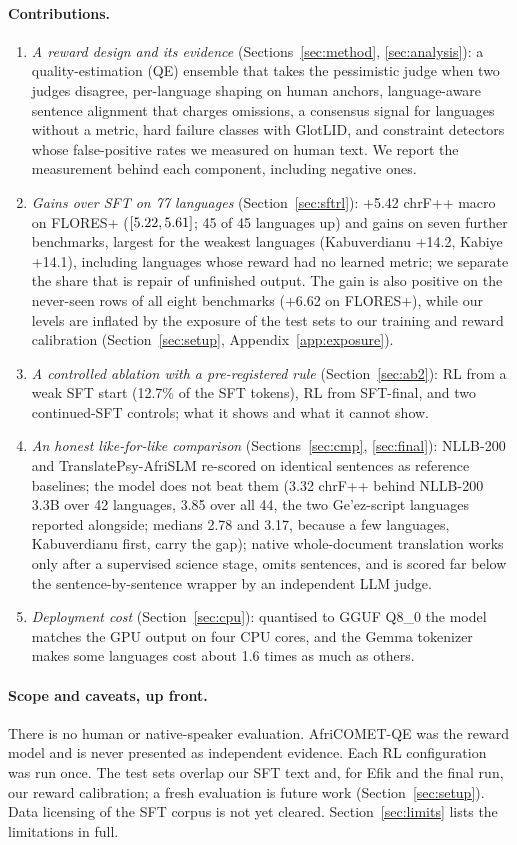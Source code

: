 \paragraph{Contributions.}
\begin{enumerate}[label=(\arabic*)]
\item \emph{A reward design and its evidence} (Sections~\ref{sec:method}, \ref{sec:analysis}): a quality-estimation (QE) ensemble that takes the pessimistic judge when two judges disagree, per-language shaping on human anchors, language-aware sentence alignment that charges omissions, a consensus signal for languages without a metric, hard failure classes with GlotLID, and constraint detectors whose false-positive rates we measured on human text. We report the measurement behind each component, including negative ones.
\item \emph{Gains over SFT on 77 languages} (Section~\ref{sec:sftrl}): +5.42 chrF++ macro on FLORES+ ($[5.22, 5.61]$; 45 of 45 languages up) and gains on seven further benchmarks, largest for the weakest languages (Kabuverdianu +14.2, Kabiye +14.1), including languages whose reward had no learned metric; we separate the share that is repair of unfinished output. The gain is also positive on the never-seen rows of all eight benchmarks (+6.62 on FLORES+), while our levels are inflated by the exposure of the test sets to our training and reward calibration (Section~\ref{sec:setup}, Appendix~\ref{app:exposure}).
\item \emph{A controlled ablation with a pre-registered rule} (Section~\ref{sec:ab2}): RL from a weak SFT start (12.7\% of the SFT tokens), RL from SFT-final, and two continued-SFT controls; what it shows and what it cannot show.
\item \emph{An honest like-for-like comparison} (Sections~\ref{sec:cmp}, \ref{sec:final}): NLLB-200 and TranslatePsy-AfriSLM re-scored on identical sentences as reference baselines; the model does not beat them (3.32 chrF++ behind NLLB-200 3.3B over 42 languages, 3.85 over all 44, the two Ge'ez-script languages reported alongside; medians 2.78 and 3.17, because a few languages, Kabuverdianu first, carry the gap); native whole-document translation works only after a supervised science stage, omits sentences, and is scored far below the sentence-by-sentence wrapper by an independent LLM judge.
\item \emph{Deployment cost} (Section~\ref{sec:cpu}): quantised to GGUF Q8\_0 the model matches the GPU output on four CPU cores, and the Gemma tokenizer makes some languages cost about 1.6 times as much as others.
\end{enumerate}
\paragraph{Scope and caveats, up front.} There is no human or native-speaker evaluation. AfriCOMET-QE was the reward model and is never presented as independent evidence. Each RL configuration was run once. The test sets overlap our SFT text and, for Efik and the final run, our reward calibration; a fresh evaluation is future work (Section~\ref{sec:setup}). Data licensing of the SFT corpus is not yet cleared. Section~\ref{sec:limits} lists the limitations in full.
